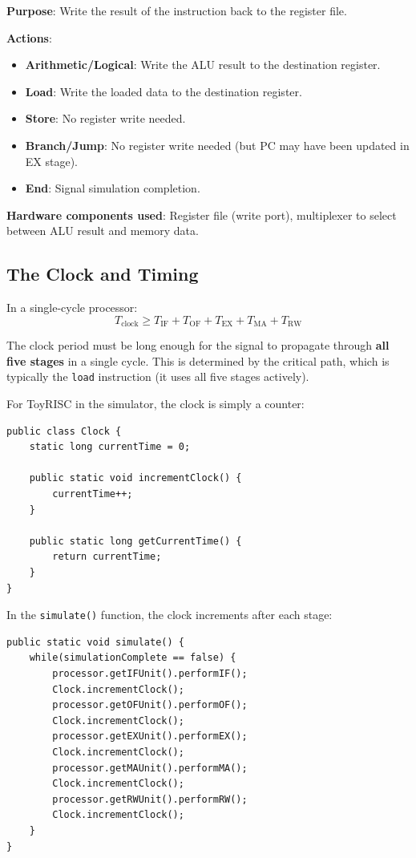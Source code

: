 \documentclass[12pt,a4paper]{article}
\begin{document}
\textbf{Purpose}: Write the result of the instruction back to the register file.

\textbf{Actions}:
\begin{itemize}
    \item \textbf{Arithmetic/Logical}: Write the ALU result to the destination register.
    \item \textbf{Load}: Write the loaded data to the destination register.
    \item \textbf{Store}: No register write needed.
    \item \textbf{Branch/Jump}: No register write needed (but PC may have been updated in EX stage).
    \item \textbf{End}: Signal simulation completion.
\end{itemize}

\textbf{Hardware components used}: Register file (write port), multiplexer to select between ALU result and memory data.

\subsection{The Clock and Timing}

In a single-cycle processor:
\[
T_{\text{clock}} \geq T_{\text{IF}} + T_{\text{OF}} + T_{\text{EX}} + T_{\text{MA}} + T_{\text{RW}}
\]

The clock period must be long enough for the signal to propagate through \textbf{all five stages} in a single cycle. This is determined by the critical path, which is typically the \texttt{load} instruction (it uses all five stages actively).

For ToyRISC in the simulator, the clock is simply a counter:

\begin{lstlisting}[style=javastyle, caption={Clock.java}]
public class Clock {
    static long currentTime = 0;

    public static void incrementClock() {
        currentTime++;
    }

    public static long getCurrentTime() {
        return currentTime;
    }
}
\end{lstlisting}

In the \texttt{simulate()} function, the clock increments after each stage:

\begin{lstlisting}[style=javastyle, caption={Simulator.java -- simulate() loop}]
public static void simulate() {
    while(simulationComplete == false) {
        processor.getIFUnit().performIF();
        Clock.incrementClock();
        processor.getOFUnit().performOF();
        Clock.incrementClock();
        processor.getEXUnit().performEX();
        Clock.incrementClock();
        processor.getMAUnit().performMA();
        Clock.incrementClock();
        processor.getRWUnit().performRW();
        Clock.incrementClock();
    }
}
\end{lstlisting}
\end{document}
